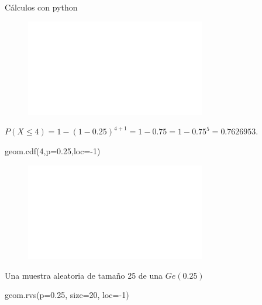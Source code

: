 \documentclass[
  ignorenonframetext,
  aspectratio=169]{beamer}
\newenvironment{Shaded}{\begin{snugshade}}{\end{snugshade}}
\newcommand{\DecValTok}[1]{\textcolor[rgb]{0.68,0.00,0.00}{#1}}
\newcommand{\FloatTok}[1]{\textcolor[rgb]{0.68,0.00,0.00}{#1}}
\newcommand{\NormalTok}[1]{\textcolor[rgb]{0.00,0.23,0.31}{#1}}
\newcommand{\OperatorTok}[1]{\textcolor[rgb]{0.37,0.37,0.37}{#1}}
\begin{document}
\begin{frame}[fragile]{Cálculos con python}
\begin{figure}

{\centering \includegraphics[width=0.7\textwidth,height=\textheight]{Tema_3_1_Notables_files/figure-beamer/py_geom_funciones2-5.pdf}

}

\end{figure}

\(P(X\leq 4)=1-(1-0.25)^{4+1}=1-0.75=1-0.75^5=0.7626953.\)

\begin{Shaded}
\begin{Highlighting}[]
\NormalTok{geom.cdf(}\DecValTok{4}\NormalTok{,p}\OperatorTok{=}\FloatTok{0.25}\NormalTok{,loc}\OperatorTok{={-}}\DecValTok{1}\NormalTok{)}
\end{Highlighting}
\end{Shaded}

\begin{figure}

{\centering \includegraphics[width=0.7\textwidth,height=\textheight]{Tema_3_1_Notables_files/figure-beamer/py_geom_funciones3-7.pdf}

}

\end{figure}

Una muestra aleatoria de tamaño 25 de una \(Ge(0.25)\)

\begin{Shaded}
\begin{Highlighting}[]
\NormalTok{geom.rvs(p}\OperatorTok{=}\FloatTok{0.25}\NormalTok{, size}\OperatorTok{=}\DecValTok{20}\NormalTok{, loc}\OperatorTok{={-}}\DecValTok{1}\NormalTok{)}
\end{Highlighting}
\end{Shaded}


\end{frame}
\end{document}

